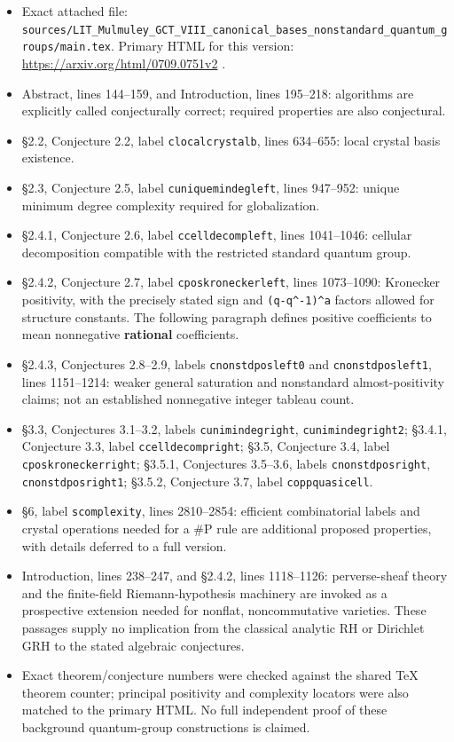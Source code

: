 \documentclass[11pt,a4paper]{article}
\providecommand{\tightlist}{\setlength{\itemsep}{0pt}\setlength{\parskip}{0pt}}
\theoremstyle{definition}\newtheorem{definition}{Definition}
\begin{document}
\begin{itemize}
\tightlist
\item
  Exact attached file:
  \nolinkurl{sources/LIT_Mulmuley_GCT_VIII_canonical_bases_nonstandard_quantum_groups/main.tex}.
  Primary HTML for this version:
  \url{https://arxiv.org/html/0709.0751v2} .
\item
  Abstract, lines 144--159, and Introduction, lines 195--218: algorithms
  are explicitly called conjecturally correct; required properties are
  also conjectural.
\item
  §2.2, Conjecture 2.2, label \nolinkurl{clocalcrystalb}, lines 634--655:
  local crystal basis existence.
\item
  §2.3, Conjecture 2.5, label \nolinkurl{cuniquemindegleft}, lines
  947--952: unique minimum degree complexity required for globalization.
\item
  §2.4.1, Conjecture 2.6, label \nolinkurl{ccelldecompleft}, lines
  1041--1046: cellular decomposition compatible with the restricted
  standard quantum group.
\item
  §2.4.2, Conjecture 2.7, label \nolinkurl{cposkroneckerleft}, lines
  1073--1090: Kronecker positivity, with the precisely stated sign and
  \texttt{(q-q\^{}-1)\^{}a} factors allowed for structure constants. The
  following paragraph defines positive coefficients to mean nonnegative
  \textbf{rational} coefficients.
\item
  §2.4.3, Conjectures 2.8--2.9, labels \nolinkurl{cnonstdposleft0} and
  \nolinkurl{cnonstdposleft1}, lines 1151--1214: weaker general saturation
  and nonstandard almost-positivity claims; not an established
  nonnegative integer tableau count.
\item
  §3.3, Conjectures 3.1--3.2, labels \nolinkurl{cunimindegright},
  \nolinkurl{cunimindegright2}; §3.4.1, Conjecture 3.3, label
  \nolinkurl{ccelldecompright}; §3.5, Conjecture 3.4, label
  \nolinkurl{cposkroneckerright}; §3.5.1, Conjectures 3.5--3.6, labels
  \nolinkurl{cnonstdposright}, \nolinkurl{cnonstdposright1}; §3.5.2,
  Conjecture 3.7, label \nolinkurl{coppquasicell}.
\item
  §6, label \nolinkurl{scomplexity}, lines 2810--2854: efficient
  combinatorial labels and crystal operations needed for a \#P rule are
  additional proposed properties, with details deferred to a full
  version.
\item
  Introduction, lines 238--247, and §2.4.2, lines 1118--1126:
  perverse-sheaf theory and the finite-field Riemann-hypothesis
  machinery are invoked as a prospective extension needed for nonflat,
  noncommutative varieties. These passages supply no implication from
  the classical analytic RH or Dirichlet GRH to the stated algebraic
  conjectures.
\item
  Exact theorem/conjecture numbers were checked against the shared TeX
  theorem counter; principal positivity and complexity locators were
  also matched to the primary HTML. No full independent proof of these
  background quantum-group constructions is claimed.
\end{itemize}
\end{document}
